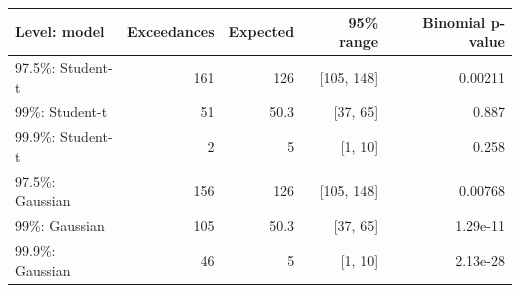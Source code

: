 \begin{tabular}{lrrrr}
\toprule
Level: model & Exceedances & Expected & 95\% range & Binomial p-value \\
\midrule
97.5\%: Student-t & 161 & 126 & [105, 148] & 0.00211 \\
99\%: Student-t & 51 & 50.3 & [37, 65] & 0.887 \\
99.9\%: Student-t & 2 & 5 & [1, 10] & 0.258 \\
97.5\%: Gaussian & 156 & 126 & [105, 148] & 0.00768 \\
99\%: Gaussian & 105 & 50.3 & [37, 65] & 1.29e-11 \\
99.9\%: Gaussian & 46 & 5 & [1, 10] & 2.13e-28 \\
\bottomrule
\end{tabular}
